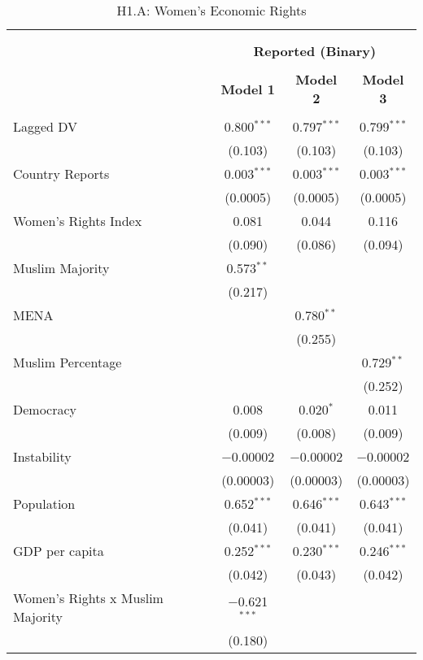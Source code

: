 
\begin{table}[!htbp] \centering 
  \caption{H1.A: Women's Economic Rights} 
  \label{} 
\begin{tabular}{@{\extracolsep{5pt}}lccc} 
\\[-1.8ex]\hline \\[-1.8ex] 
\\[-1.8ex] & \multicolumn{3}{c}{\textbf{Reported (Binary)}} \\ 
\\[-1.8ex] & \textbf{Model 1} & \textbf{Model 2} & \textbf{Model 3}\\ 
\hline \\[-1.8ex] 
 Lagged DV & 0.800$^{***}$ & 0.797$^{***}$ & 0.799$^{***}$ \\ 
  & (0.103) & (0.103) & (0.103) \\ 
  Country Reports & 0.003$^{***}$ & 0.003$^{***}$ & 0.003$^{***}$ \\ 
  & (0.0005) & (0.0005) & (0.0005) \\ 
  Women's Rights Index & 0.081 & 0.044 & 0.116 \\ 
  & (0.090) & (0.086) & (0.094) \\ 
  Muslim Majority & 0.573$^{**}$ &  &  \\ 
  & (0.217) &  &  \\ 
  MENA &  & 0.780$^{**}$ &  \\ 
  &  & (0.255) &  \\ 
  Muslim Percentage &  &  & 0.729$^{**}$ \\ 
  &  &  & (0.252) \\ 
  Democracy & 0.008 & 0.020$^{*}$ & 0.011 \\ 
  & (0.009) & (0.008) & (0.009) \\ 
  Instability & $-$0.00002 & $-$0.00002 & $-$0.00002 \\ 
  & (0.00003) & (0.00003) & (0.00003) \\ 
  Population & 0.652$^{***}$ & 0.646$^{***}$ & 0.643$^{***}$ \\ 
  & (0.041) & (0.041) & (0.041) \\ 
  GDP per capita & 0.252$^{***}$ & 0.230$^{***}$ & 0.246$^{***}$ \\ 
  & (0.042) & (0.043) & (0.042) \\ 
  Women's Rights x Muslim Majority & $-$0.621$^{***}$ &  &  \\ 
  & (0.180) &  &  \\ 

\end{tabular}
\end{table}
